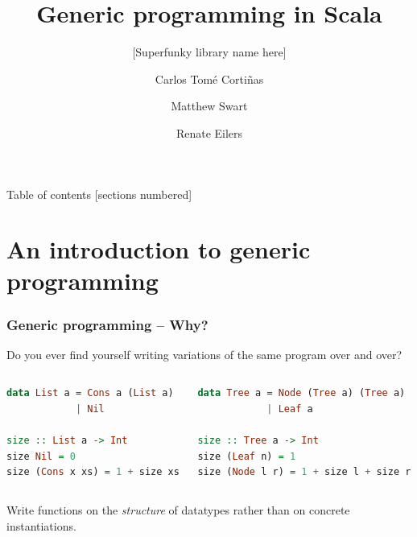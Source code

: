 \documentclass[10pt]{beamer}
\title{Generic programming in Scala}
\subtitle{[Superfunky library name here]}
\date{}
\author{Carlos Tomé Cortiñas
\and Matthew Swart
\and Renate Eilers}
\institute{Department of Information and Computing Sciences, Utrecht University}
\begin{document}
\maketitle

\begin{frame}{Table of contents}
  [sections numbered]
  \tableofcontents[hideallsubsections]
\end{frame}

\section{An introduction to generic programming}

\begin{frame}[fragile]
\frametitle{Generic programming -- Why?}

Do you ever find yourself writing variations of the same program over and over?

\begin{columns}
\begin{column}{.40\textwidth}
\begin{lstlisting}[language=Haskell,basicstyle=\ttfamily\scriptsize]
data List a = Cons a (List a)
            | Nil

size :: List a -> Int
size Nil = 0
size (Cons x xs) = 1 + size xs
\end{lstlisting}
\end{column}
\begin{column}{.48\textwidth}
\begin{lstlisting}[language=Haskell,basicstyle=\ttfamily\scriptsize]
data Tree a = Node (Tree a) (Tree a)
            | Leaf a

size :: Tree a -> Int
size (Leaf n) = 1
size (Node l r) = 1 + size l + size r
\end{lstlisting}
\end{column}
\end{columns}

Write functions on the {\color{green}\emph{structure}} of datatypes rather than on concrete instantiations.
\end{frame}
\end{document}
